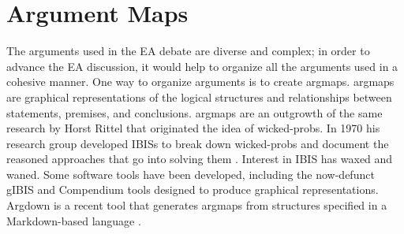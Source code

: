 \propsend






\section{Argument Maps}
\label{sec-arg-maps-intro}

The arguments used in the \ac{EA} debate are diverse and complex; in order to advance the \ac{EA} discussion, it would
help to organize all the arguments used in a cohesive manner. One way to organize arguments is to create \acp{argmap}.
\Acp{argmap} are graphical representations of the logical structures and relationships between statements, premises, and
conclusions. \Acp{argmap} are an outgrowth of the same research by Horst Rittel that originated the idea of
\acp{wicked-prob}. In 1970 his research group developed \acp{IBIS} to break down \acp{wicked-prob} and document the
reasoned approaches that go into solving them \cite{kunz_issues_1970}. Interest in \ac{IBIS} has waxed and waned. Some
software tools have been developed, including the now-defunct gIBIS \cite{conklin_gibis_1988} and Compendium
\cite{dutoit_hypermedia_2006} tools designed to produce graphical representations. Argdown is a recent tool that
generates \acp{argmap} from structures specified in a Markdown-based language \cite{voigt_argdown_2018}.

